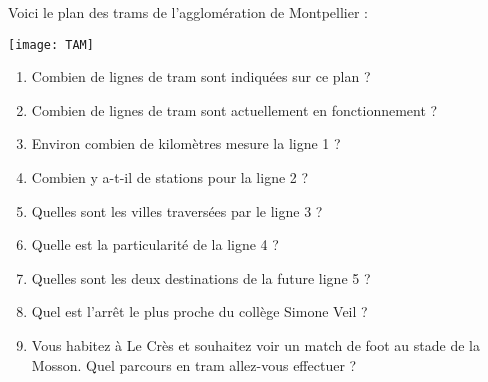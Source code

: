 \begin{exercice}
   Voici le plan des trams de l'agglomération de Montpellier : \\ [1mm]
   \begin{minipage}{11.5cm}
      \texttt{[image: TAM]}
   \end{minipage}
   \quad
   \begin{minipage}{5.5cm}
      \begin{enumerate}
         \item Combien de lignes de tram sont indiquées sur ce plan ?
         \item Combien de lignes de tram sont actuellement en fonctionnement ?
         \item Environ combien de kilomètres mesure la ligne 1 ?
         \item Combien y a-t-il de stations pour la ligne 2 ?
         \item Quelles sont les villes traversées par le ligne 3 ?
         \item Quelle est la particularité de la ligne 4 ?
         \item Quelles sont les deux destinations de la future ligne 5 ?
         \item Quel est l'arrêt le plus proche du collège Simone Veil ?
         \item Vous habitez à Le Crès et souhaitez voir un match de foot au stade de la Mosson. Quel parcours en tram allez-vous effectuer ? 
      \end{enumerate}
   \end{minipage}
\end{exercice}


\Recreation

